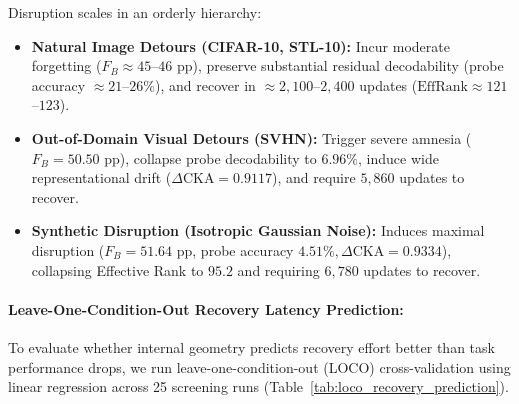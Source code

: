 \documentclass[sn-mathphys,Numbered]{sn-jnl}
\newcommand{\EffRank}{\mathrm{EffRank}}
\begin{document}
Disruption scales in an orderly hierarchy:
\begin{itemize}
    \item \textbf{Natural Image Detours (CIFAR-10, STL-10):} Incur moderate forgetting ($F_B \approx 45$--$46$ pp), preserve substantial residual decodability (probe accuracy $\approx 21$--$26\%$), and recover in $\approx 2{,}100$--$2{,}400$ updates ($\EffRank \approx 121$--$123$).
    \item \textbf{Out-of-Domain Visual Detours (SVHN):} Trigger severe amnesia ($F_B = 50.50$ pp), collapse probe decodability to $6.96\%$, induce wide representational drift ($\Delta\mathrm{CKA} = 0.9117$), and require $5{,}860$ updates to recover.
    \item \textbf{Synthetic Disruption (Isotropic Gaussian Noise):} Induces maximal disruption ($F_B = 51.64$ pp, probe accuracy $4.51\%, \Delta\mathrm{CKA} = 0.9334$), collapsing Effective Rank to $95.2$ and requiring $6{,}780$ updates to recover.
\end{itemize}

\begin{table}[t]
\caption{Leave-one-condition-out (LOCO) cross-validation errors (Mean Absolute Error, in Phase 3 recovery updates) predicting target recovery latency ($u_{\mathrm{rec}}$) under ordinary linear regression across screening conditions ($N = 25$ runs).}\label{tab:loco_recovery_prediction}
\centering
{}
\end{table}

\paragraph{Leave-One-Condition-Out Recovery Latency Prediction:}\label{subsubsec:loco_prediction}
To evaluate whether internal geometry predicts recovery effort better than task performance drops, we run leave-one-condition-out (LOCO) cross-validation using linear regression across 25 screening runs (Table~\ref{tab:loco_recovery_prediction}).
\end{document}

